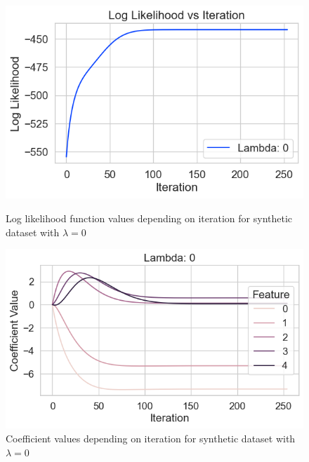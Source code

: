 \documentclass[12pt]{article}
\begin{document}
\begin{figure}[h]
    \centering
    \begin{minipage}{0.48\textwidth}
        \centering
        \includegraphics[width=\textwidth]{../results/log_likelihood_synthetic_dataset_lambda_0.png}
        \caption{Log likelihood function values depending on iteration for synthetic dataset with $\lambda=0$}
        \label{fig:log-likelihood-synthetic-dataset-lambda-0}
    \end{minipage}
    \hfill
    \begin{minipage}{0.48\textwidth}
        \centering
        \includegraphics[width=\textwidth]{../results/coefficients_synthetic_dataset_lambda_0.png}
        \caption{Coefficient values depending on iteration for synthetic dataset with $\lambda=0$}
        \label{fig:coefficients-synthetic-dataset-lambda-0}
    \end{minipage}
\end{figure}
\end{document}
